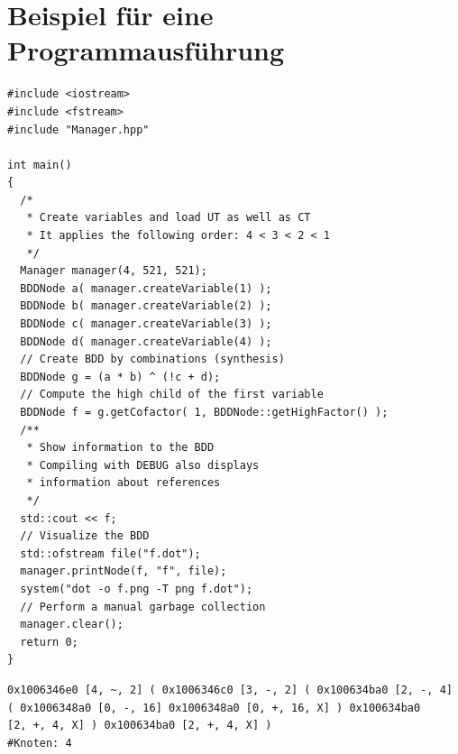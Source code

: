 \section*{Beispiel für eine Programmausführung}
\label{sec:program}
\begin{lstlisting}[frame=htrbl, caption={Implementierung von {\ttfamily main}}, label={lst:main}, basicstyle=\small]
#include <iostream>
#include <fstream>
#include "Manager.hpp"

int main()
{
  /*
   * Create variables and load UT as well as CT
   * It applies the following order: 4 < 3 < 2 < 1
   */
  Manager manager(4, 521, 521);
  BDDNode a( manager.createVariable(1) );
  BDDNode b( manager.createVariable(2) );
  BDDNode c( manager.createVariable(3) );
  BDDNode d( manager.createVariable(4) );
  // Create BDD by combinations (synthesis)
  BDDNode g = (a * b) ^ (!c + d);
  // Compute the high child of the first variable
  BDDNode f = g.getCofactor( 1, BDDNode::getHighFactor() );
  /**
   * Show information to the BDD
   * Compiling with DEBUG also displays 
   * information about references
   */
  std::cout << f;
  // Visualize the BDD
  std::ofstream file("f.dot");
  manager.printNode(f, "f", file);
  system("dot -o f.png -T png f.dot");
  // Perform a manual garbage collection
  manager.clear();
  return 0;
}
\end{lstlisting}
\begin{verbatim}
0x1006346e0 [4, ~, 2] ( 0x1006346c0 [3, -, 2] ( 0x100634ba0 [2, -, 4] 
( 0x1006348a0 [0, -, 16] 0x1006348a0 [0, +, 16, X] ) 0x100634ba0 
[2, +, 4, X] ) 0x100634ba0 [2, +, 4, X] ) 
#Knoten: 4
\end{verbatim}
\newpage
